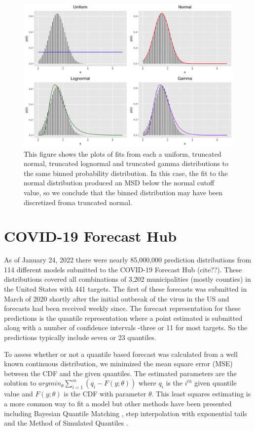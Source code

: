 \documentclass[11pt,notitlepage]{isuthesis}
\begin{document}
\begin{figure}[htbp]
\centerline{\includegraphics[scale=.15]{Images/flu_fit_17_10_3.png}}
\caption[Parametric distribution fits to binned distribution]{This figure shows
the plots of fits from each a uniform, truncated normal, truncated lognormal
and truncated gamma distributions to the same binned probability distribution.
In this case, the fit to the normal distribution produced an MSD below the 
normal cutoff value, so we conclude that the binned distribution may have been
discretized froma truncated normal.}
\label{fig:binparamfits}
\end{figure}



\section{COVID-19 Forecast Hub}

As of January 24, 2022 there were nearly 85,000,000 prediction distributions 
from 114 different models submitted to the COVID-19 Forecast Hub (cite??). These 
distributions covered all combinations of 3,202 municipalities (mostly counties) 
in the United States with 441 targets. The first of these forecasts was 
submitted in March of 2020 shortly after the initial outbreak of the virus in 
the US and forecasts had been received weekly since. The forecast representation
for these predictions is the quantile representation where a point estimated is
submitted along with a number of confidence intervals -three or 11 for most
targets. So the predictions typically include seven or 23 quantiles.

To assess whether or not a quantile based forecast was calculated from a well
known continuous distribution, we minimized the mean square error (MSE) between 
the CDF and the given quantiles. The estimated parameters are the 
solution to $argmin_{\theta} \sum_{i=1}^m (q_i - F(y; \theta))$ where $q_i$ is
the $i^{th}$ given quantile value and $F(y; \theta)$ is the CDF with parameter
$\theta$. This least squares estimating is a more common way to fit a model but
other methods have been presented including Bayesian Quantile Matching
\cite{nirwan2020bayesian}, step interpolation with exponential tails 
\cite{quinonero2005evaluating}
and the Method of Simulated Quantiles 
\cite{dominicy2013method}.
\end{document}
